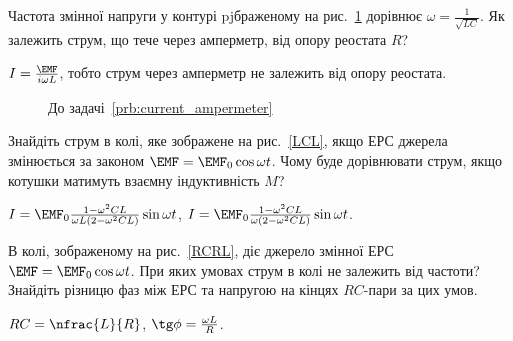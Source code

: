 \begin{problem}\label{prb:current_ampermeter}
Частота змінної напруги у контурі pjбраженому на рис.~\ref{current_ampermeter} дорівнює $\omega = \frac{1}{\sqrt{LC}}$. Як залежить струм, що тече через амперметр, від опору реостата $R$?
\begin{solution}
	$I = \frac{\EMF}{i\omega L}$, тобто струм через амперметр не залежить від опору реостата.
\end{solution}
\end{problem}
\begin{figure}[h!]\centering
	\caption{До задачі~\ref{prb:current_ampermeter}}
	\label{current_ampermeter}
\end{figure}

\begin{problem}\label{prb:LCL}%
Знайдіть струм в колі, яке зображене на рис.~\ref{LCL}, якщо ЕРС джерела змінюється за законом $\EMF = \EMF_0\cos\omega t$. Чому буде дорівнювати струм, якщо котушки матимуть взаємну індуктивність $M$?
\begin{solution}
	$I = \EMF_0\frac{1 - \omega^2CL}{\omega L(2 - \omega^2CL)}\sin\omega t$, $I = \EMF_0\frac{1 - \omega^2CL}{\omega(2 - \omega^2CL)}\sin\omega t$.
\end{solution}
\end{problem}

\begin{problem}\label{prb:RCRL}%
В колі, зображеному на рис.~\ref{RCRL}, діє джерело змінної ЕРС  $\EMF = \EMF_0\cos\omega t$. При яких умовах струм в колі не залежить від частоти? Знайдіть різницю фаз між ЕРС та напругою на кінцях $RC$-пари за цих умов.
\begin{solution}
	$RC = \nfrac{L}{R}$, $\tg\phi = \frac{\omega L}{R}$.
\end{solution}
\end{problem}

